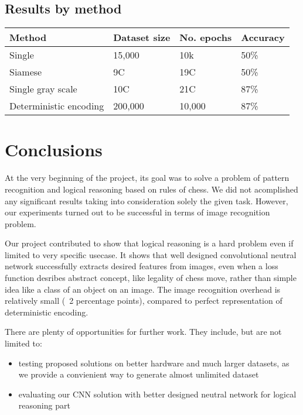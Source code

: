 \documentclass[10pt,twocolumn,letterpaper]{article}
\begin{document}
\subsection{Results by method}



\begin{center}
    \begin{tabular}{ | p{5em} | p{5em} | p{5em} | p{5em} |}
    \hline
    Method & Dataset size & No. epochs & Accuracy \\ [0.5ex] 
    \hline \hline
    Single & 15,000 & 10k & 50\% \\ 
    \hline
    Siamese & 9C & 19C & 50\% \\ \hline
    Single gray scale & 10C & 21C & 87\% \\
    \hline
    Deterministic encoding & 200,000 & 10,000 & 87\% \\
    \hline
    \end{tabular}
\end{center}

\section{Conclusions}

At the very beginning of the project, its goal was to solve a problem of
pattern recognition and logical reasoning based on rules of chess.
We did not acomplished any significant results taking into consideration 
solely the given task. However, our experiments turned out to be successful in
terms of image recognition problem. 


Our project contributed to show that logical reasoning is a hard problem even
if limited to very specific usecase. It shows that well designed 
convolutional neutral network successfully extracts desired features from images, 
even when a loss function desribes abstract concept, like legality of chess move, 
rather than simple idea like a class of an object on an image. The image recognition
overhead is relatively small (~2 percentage points), compared to perfect representation
of deterministic encoding.


There are plenty of opportunities for further work. They include, but are not limited to:
\begin{itemize} 
\item testing proposed solutions on better hardware and much larger datasets,
as we provide a convienient way to generate almost unlimited dataset
\item evaluating our CNN solution with better designed neutral
network for logical reasoning part

\end{itemize}
\end{document}
